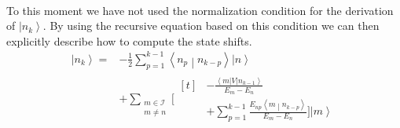 \documentclass[10pt,fleqn]{article}
\newcommand{\bra}[1]{\left\langle #1 \right\vert}
\newcommand{\ket}[1]{\left\vert #1 \right\rangle}
\newcommand{\bracket}[2]{\left\langle #1 \middle\vert #2 \right\rangle}
\begin{document}
\begin{multicols}{2}
\[\begin{aligned}
          \end{aligned}
      \]
      To this moment we have not used the normalization condition for the derivation of $\ket{n_k}$.
      By using the recursive equation based on this condition we can then explicitly describe how to compute the state shifts.
      \[
          \begin{aligned}
            \ket{n_k} =
            &-\frac{1}{2}\sum_{p=1}^{k-1} \bracket{n_p}{n_{k-p}}\ket{n} \\
            &+ \sum_{\substack{m\in\mathscr{I}\\m\neq n}} \bigg[
              \begin{aligned}[t]
                &-\frac{\bra{m}V\ket{n_{k-1}}}{E_m-E_n} \\
                &+ \sum_{p=1}^{k-1} \frac{E_{np}\bracket{m}{n_{k-p}}}{E_m - E_n} \bigg] \ket{m}
              \end{aligned}
          \end{aligned}
      \]


\end{multicols}
\end{document}
